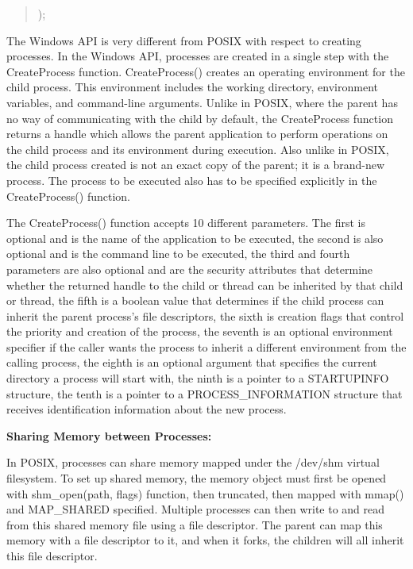 \documentclass[letterpaper,10pt,titlepage]{article}
\newcommand{\tab}{\hspace*{2em}} %
\begin{document}
\begin{enumerate}
\begin{quote}
);
\end{quote}

\tab The Windows API is very different from POSIX with respect to creating processes. In the Windows API, processes are created in a single step with the CreateProcess function. CreateProcess() creates an operating environment for the child process. This environment includes the working directory, environment variables, and command-line arguments. Unlike in POSIX, where the parent has no way of communicating with the child by default, the CreateProcess function returns a handle which allows the parent application to perform operations on the child process and its environment during execution. Also unlike in POSIX, the child process created is not an exact copy of the parent; it is a brand-new process. The process to be executed also has to be specified explicitly in the CreateProcess() function. \newline

\tab The CreateProcess() function accepts 10 different parameters. The first is optional and is the name of the application to be executed, the second is also optional and is the command line to be executed, the third and fourth parameters are also optional and are the security attributes that determine whether the returned handle to the child or thread can be inherited by that child or thread, the fifth is a boolean value that determines if the child process can inherit the parent process's file descriptors, the sixth is creation flags that control the priority and creation of the process, the seventh is an optional environment specifier if the caller wants the process to inherit a different environment from the calling process, the eighth is an optional argument that specifies the current directory a process will start with, the ninth is a pointer to a STARTUPINFO structure, the tenth is a pointer to a PROCESS\_INFORMATION structure that receives identification information about the new process. \newline

\textbf{Sharing Memory between Processes:} \newline


\tab In POSIX, processes can share memory mapped under the /dev/shm virtual filesystem. To set up shared memory, the memory object must first be opened with shm\_open(path, flags) function, then truncated, then mapped with mmap() and MAP\_SHARED specified. Multiple processes can then write to and read from this shared memory file using a file descriptor. The parent can map this memory with a file descriptor to it, and when it forks, the children will all inherit this file descriptor. \newline


\end{enumerate}
\end{document}
